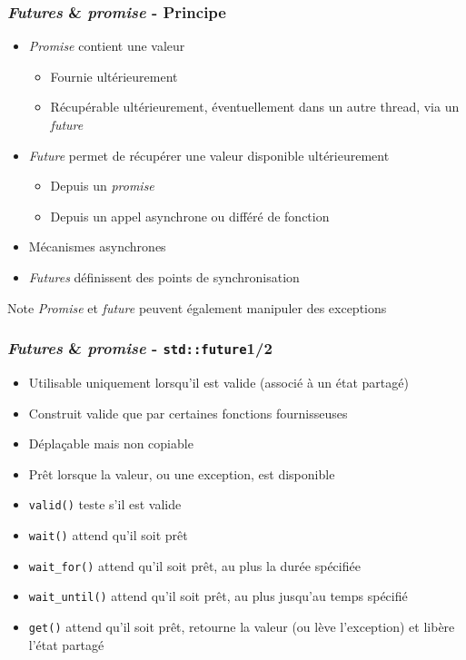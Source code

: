 \documentclass[C++.tex]{subfiles}
\begin{document}
\begin{frame}[fragile]
	\frametitle{\textit{Futures} \& \textit{promise} - Principe}
	\begin{itemize}
		\item \textit{Promise} contient une valeur
		\begin{itemize}
			\item Fournie ultérieurement
			\item Récupérable ultérieurement, éventuellement dans un autre thread, via un \textit{future}
		\end{itemize}
		\item \textit{Future} permet de récupérer une valeur disponible ultérieurement
		\begin{itemize}
			\item Depuis un \textit{promise}
			\item Depuis un appel asynchrone ou différé de \og fonction\fg{}
		\end{itemize}
		\item Mécanismes asynchrones
		\item \textit{Futures} définissent des points de synchronisation
	\end{itemize}

	\begin{block}{Note}
		\textit{Promise} et \textit{future} peuvent également manipuler des exceptions
	\end{block}
\end{frame}

\begin{frame}[fragile]
	\frametitle{\textit{Futures} \& \textit{promise} - \lstinline|std::future|\titlehfill{}1/2}
	\begin{itemize}
		\item Utilisable uniquement lorsqu'il est valide (associé à un état partagé)
		\item Construit valide que par certaines fonctions \og fournisseuses\fg{}
		\item Déplaçable mais non copiable
		\item Prêt lorsque la valeur, ou une exception, est disponible
		\item \lstinline|valid()| teste s'il est valide
		\item \lstinline|wait()| attend qu'il soit prêt
		\item \lstinline|wait_for()| attend qu'il soit prêt, au plus la durée spécifiée
		\item \lstinline|wait_until()| attend qu'il soit prêt, au plus jusqu'au temps spécifié
		\item \lstinline|get()| attend qu'il soit prêt, retourne la valeur (ou lève l'exception) et libère l'état partagé
	\end{itemize}
\end{frame}
\end{document}
